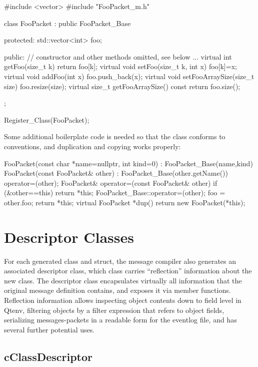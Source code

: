\begin{cpp}
#include <vector>
#include "FooPacket_m.h"

class FooPacket : public FooPacket_Base
{
  protected:
    std::vector<int> foo;

  public:
    // constructor and other methods omitted, see below
    ...
    virtual int getFoo(size_t k) {return foo[k];}
    virtual void setFoo(size_t k, int x) {foo[k]=x;}
    virtual void addFoo(int x) {foo.push_back(x);}
    virtual void setFooArraySize(size_t size) {foo.resize(size);}
    virtual size_t getFooArraySize() const {return foo.size();}
};

Register_Class(FooPacket);
\end{cpp}

Some additional boilerplate code is needed so that the class conforms
to conventions, and duplication and copying works properly:

\begin{cpp}
    FooPacket(const char *name=nullptr, int kind=0) : FooPacket_Base(name,kind) {
    }
    FooPacket(const FooPacket& other) : FooPacket_Base(other.getName()) {
        operator=(other);
    }
    FooPacket& operator=(const FooPacket& other) {
        if (&other==this) return *this;
        FooPacket_Base::operator=(other);
        foo = other.foo;
        return *this;
    }
    virtual FooPacket *dup() {
        return new FooPacket(*this);
    }
\end{cpp}


\section{Descriptor Classes}
\label{sec:msg-defs:descriptor-classes}

For each generated class and struct, the message compiler also generates an
associated descriptor class, which class carries ``reflection'' information
about the new class. The descriptor class encapsulates virtually all information
that the original message definition contains, and exposes it via member
functions. Reflection information allows inspecting object contents down to
field level in Qtenv, filtering objects by a filter expression that refers to
object fields, serializing messages-packets in a readable form for the eventlog
file, and has several further potential uses.


\subsection{cClassDescriptor}
\label{sec:msg-defs:cclassdescriptor}


